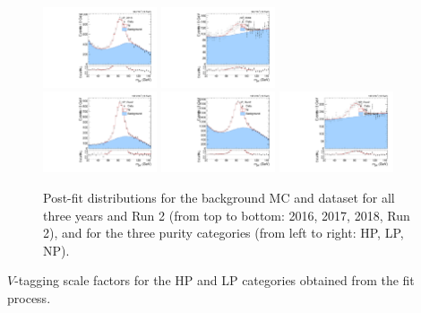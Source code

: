 \begin{figure}[htbp]
  \includegraphics[width=0.3\textwidth]{fig/Vtag/PostFit__MJJ__allC_allL_LP_2018.pdf}
  \includegraphics[width=0.3\textwidth]{fig/Vtag/PostFit__MJJ__allC_allL_NP_2018.pdf}\\
  \includegraphics[width=0.3\textwidth]{fig/Vtag/PostFit__MJJ__allC_allL_HP_Run2.pdf}
  \includegraphics[width=0.3\textwidth]{fig/Vtag/PostFit__MJJ__allC_allL_LP_Run2.pdf}
  \includegraphics[width=0.3\textwidth]{fig/Vtag/PostFit__MJJ__allC_allL_NP_Run2.pdf}\\
  \caption{
    Post-fit distributions for the background MC and dataset for all three years and Run 2 (from top to bottom: 2016, 2017, 2018, Run 2), and for the three purity categories (from left to right: HP, LP, NP).
  }
  \label{fig:VTag_postfit_Run2}
\end{figure}

\begin{table}[htbp]
  \centering
  
  \caption{
    $V$-tagging scale factors for the HP and LP categories obtained from the fit process.
  }
  \label{tab:VTagFactors}
\end{table}

